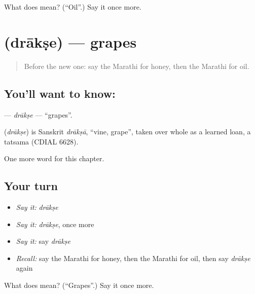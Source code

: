 \begin{tcolorbox}[breakable,colback=teal!4,colframe=teal!35!black,title={Before you move on}]
What does  mean? (\textquotedblleft{}Oil\textquotedblright{}.) Say it once more.
\end{tcolorbox}
\section[\texorpdfstring{\mr{द्राक्षे} (drākṣe)}{द्राक्षे (drākṣe)}]{ (drākṣe) — grapes}

\label{lesson:MR-C87-drakse}



\begin{quote}
Before the new one: say the Marathi for honey, then the Marathi for oil.
\end{quote}

\subsection*{You'll want to know: }
\textbf{} — \emph{drākṣe} — \textquotedblleft{}grapes\textquotedblright{}.

\begin{cousinweb}
\textbf{} (\emph{drākṣe}) is Sanskrit \emph{drākṣā}, \textquotedblleft{}vine, grape\textquotedblright{}, taken over whole as a learned loan, a tatsama (CDIAL 6628).
\end{cousinweb}

\begin{grammarlens}[title={What you've built}]
One more word for this chapter.
\end{grammarlens}

\subsection*{Your turn}
\begin{itemize}
\raggedright
  \item \emph{Say it:} \emph{drākṣe}
  \item \emph{Say it:} \emph{drākṣe}, once more
  \item \emph{Say it:} say \emph{drākṣe}
  \item \emph{Recall:} say the Marathi for honey, then the Marathi for oil, then say \emph{drākṣe} again
\end{itemize}

\begin{tcolorbox}[breakable,colback=teal!4,colframe=teal!35!black,title={Before you move on}]
What does  mean? (\textquotedblleft{}Grapes\textquotedblright{}.) Say it once more.
\end{tcolorbox}
